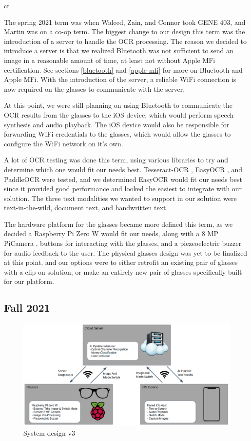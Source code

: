 ct\documentclass[a4paper,11pt]{article}
\begin{document}
The spring 2021 term was when Waleed, Zain, and Connor took GENE 403, and Martin was on a co-op term. The biggest change to our design this term was the introduction of a server to handle the OCR processing. The reason we decided to introduce a server is that we realized Bluetooth was not sufficient to send an image in a reasonable amount of time, at least not without Apple MFi certification. See sections \ref{bluetooth} and \ref{apple-mfi} for more on Bluetooth and Apple MFi. With the introduction of the server, a reliable WiFi connection is now required on the glasses to communicate with the server. 

At this point, we were still planning on using Bluetooth to communicate the OCR results from the glasses to the iOS device, which would perform speech synthesis and audio playback. The iOS device would also be responsible for forwarding WiFi credentials to the glasses, which would allow the glasses to configure the WiFi network on it's own.

A lot of OCR testing was done this term, using various libraries to try and determine which one would fit our needs best. Tesseract-OCR \cite{tesseract-github}, EasyOCR \cite{easy-ocr}, and PaddleOCR \cite{paddle-ocr} were tested, and we determined EasyOCR would fit our needs best since it provided good performance and looked the easiest to integrate with our solution. The three text modalities we wanted to support in our solution were text-in-the-wild, document text, and handwritten text.

The hardware platform for the glasses became more defined this term, as we decided a Raspberry Pi Zero W \cite{rpi-zero-w} would fit our needs, along with a 8 MP PiCamera \cite{rpi-camera}, buttons for interacting with the glasses, and a piezeoelectric buzzer for audio feedback to the user. The physical glasses design was yet to be finalized at this point, and our options were to either retrofit an existing pair of glasses with a clip-on solution, or make an entirely new pair of glasses specifically built for our platform.

\subsection{Fall 2021}
\label{fall-2021-design}
\begin{figure}[H]
\centering
\includegraphics[scale=0.4]{img/system_diagrams/system_diagram_v3.png}
\caption{System design v3}
\label{fig:system_diagram_v3}
\end{figure}
\end{document}
